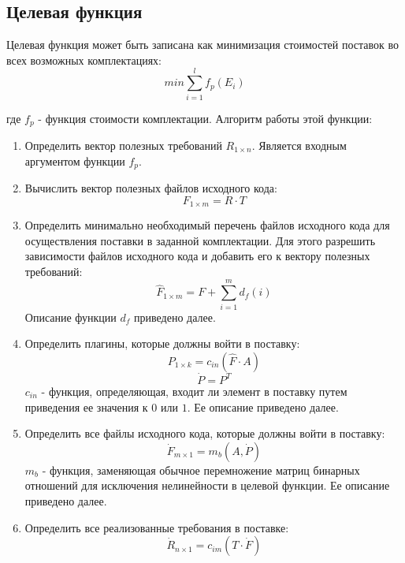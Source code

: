 \subsection*{Целевая функция}
Целевая функция может быть записана как минимизация стоимостей поставок во всех возможных комплектациях:
\begin{equation}
    \displaystyle min \sum^{l}_{i = 1} f_{p}(E_{i})
\end{equation}

где $f_{p}$ - функция стоимости комплектации. Алгоритм работы этой функции:

\begin{enumerate}
  \item Определить вектор полезных требований $R_{1 \times n}$. Является входным аргументом функции $f_{p}$.
  \item Вычислить вектор полезных файлов исходного кода:
  \begin{equation}
    F_{1 \times m} = R \cdot T
  \end{equation}
  \item Определить минимально необходимый перечень файлов исходного кода для осуществления поставки в заданной комплектации. Для этого разрешить зависимости файлов исходного кода и добавить его к вектору полезных требований: 
  \begin{equation}
    \displaystyle \hat{F}_{1 \times m} = F + \sum^{m}_{i = 1}d_{f}(i)
  \end{equation}
  Описание функции $d_{f}$ приведено далее.
  \item Определить плагины, которые должны войти в поставку:
  \begin{equation}
    P_{1 \times k} = c_{in}(\hat{F} \cdot A)
  \end{equation}
  \begin{equation}
    \dot{P} = P^{T}
  \end{equation}
  $c_{in}$ - функция, определяющая, входит ли элемент в поставку путем приведения ее значения к $0$ или $1$. Ее описание приведено далее.
  \item Определить все файлы исходного кода, которые должны войти в поставку:
  \begin{equation}
    \dot{F}_{m \times 1} = m_{b}(A, \dot{P})
  \end{equation}
  $m_{b}$ - функция, заменяющая обычное перемножение матриц бинарных отношений для исключения нелинейности в целевой функции. Ее описание приведено далее.
  \item Определить все реализованные требования в поставке:
  \begin{equation}
    \dot{R}_{n \times 1} = c_{im}(T \cdot \dot{F})
  \end{equation}

\end{enumerate}


